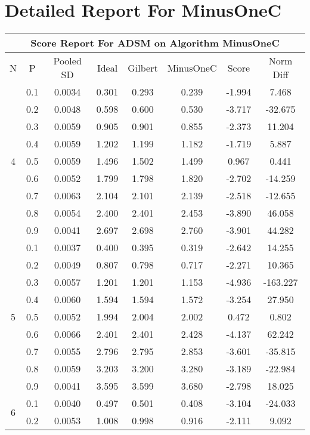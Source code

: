 \documentclass[11pt,a4paper]{report}
\begin{document}
\chapter{Detailed Report For MinusOneC}
\begin{longtable}{ | c | c || c | c | c | c | c | c | }
\hline
\multicolumn{8}{|c|}{ Score Report For ADSM on Algorithm MinusOneC} \\
\hline
N & P & Pooled SD &  Ideal &  Gilbert & MinusOneC  & Score & Norm Diff \\
 \hline
 \hline
 \endhead
\multirow{9}{*}{4} & 0.1 & 0.0034 & 0.301 & 0.293 & 0.239 & -1.994 & 7.468 \\
 & 0.2 & 0.0048 & 0.598 & 0.600 & 0.530 & -3.717 & -32.675 \\
 & 0.3 & 0.0059 & 0.905 & 0.901 & 0.855 & -2.373 & 11.204 \\
 & 0.4 & 0.0059 & 1.202 & 1.199 & 1.182 & -1.719 & 5.887 \\
 & 0.5 & 0.0059 & 1.496 & 1.502 & 1.499 & 0.967 & 0.441 \\
 & 0.6 & 0.0052 & 1.799 & 1.798 & 1.820 & -2.702 & -14.259 \\
 & 0.7 & 0.0063 & 2.104 & 2.101 & 2.139 & -2.518 & -12.655 \\
 & 0.8 & 0.0054 & 2.400 & 2.401 & 2.453 & -3.890 & 46.058 \\
 & 0.9 & 0.0041 & 2.697 & 2.698 & 2.760 & -3.901 & 44.282 \\
 \hline
\multirow{9}{*}{5} & 0.1 & 0.0037 & 0.400 & 0.395 & 0.319 & -2.642 & 14.255 \\
 & 0.2 & 0.0049 & 0.807 & 0.798 & 0.717 & -2.271 & 10.365 \\
 & 0.3 & 0.0057 & 1.201 & 1.201 & 1.153 & -4.936 & -163.227 \\
 & 0.4 & 0.0060 & 1.594 & 1.594 & 1.572 & -3.254 & 27.950 \\
 & 0.5 & 0.0052 & 1.994 & 2.004 & 2.002 & 0.472 & 0.802 \\
 & 0.6 & 0.0066 & 2.401 & 2.401 & 2.428 & -4.137 & 62.242 \\
 & 0.7 & 0.0055 & 2.796 & 2.795 & 2.853 & -3.601 & -35.815 \\
 & 0.8 & 0.0059 & 3.203 & 3.200 & 3.280 & -3.189 & -22.984 \\
 & 0.9 & 0.0041 & 3.595 & 3.599 & 3.680 & -2.798 & 18.025 \\
 \hline
\multirow{9}{*}{6} & 0.1 & 0.0040 & 0.497 & 0.501 & 0.408 & -3.104 & -24.033 \\
 & 0.2 & 0.0053 & 1.008 & 0.998 & 0.916 & -2.111 & 9.092 \\

\end{longtable}
\end{document}
